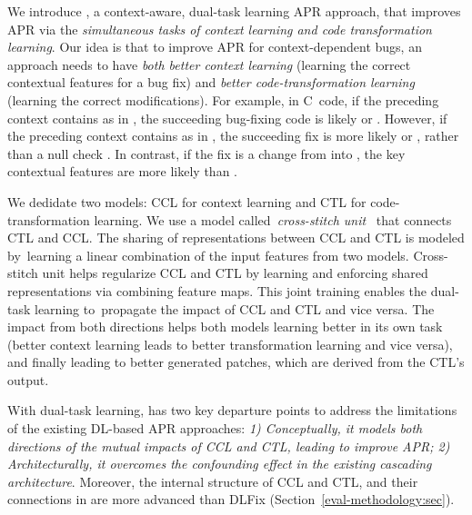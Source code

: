 We introduce {\tool}, a context-aware, dual-task learning APR
approach, that improves APR via the {\em simultaneous tasks of context
  learning and code transformation learning}. Our idea is that to
improve APR for context-dependent bugs, an approach needs to have {\em
  both better context learning} (learning the correct contextual
features for a bug fix) and {\em better code-transformation learning}
(learning the correct modifications). For example, in C~code, if the
preceding context contains  as in , the succeeding bug-fixing code is likely 
 \code{!=}  or  \code{==}
. However, if the preceding context contains 
as in  \code{=} , the
succeeding fix is more likely  \code{!=}
 or  \code{==} , rather than a
null check  \code{!=} . In contrast, if the
fix is a change from  \code{==}  into
 \code{!=} , the key contextual features are
more likely  than .

We dedidate two models: CCL for context learning and CTL for
code-transformation learning. We use a model called~{\em cross-stitch
  unit}~\cite{misra2016cross} that connects CTL and CCL. The sharing
of representations between CCL and CTL is modeled by~learning a linear
combination of the input features from two models. Cross-stitch unit
helps regularize CCL and CTL by learning and enforcing shared
representations via combining feature maps. This joint training enables
the dual-task learning to~pro\-pagate the impact of CCL and CTL and vice
versa. The impact from both directions helps both models learning
better in its own task (better context learning leads to better
transformation learning and vice versa), and finally leading to
better generated patches, which are derived from the CTL's output.


%
With dual-task learning, {\tool} has two key departure points to
address the limitations of the existing DL-based APR approaches: {\em
  1) Conceptually, it models both directions of the mutual impacts of
  CCL and CTL, leading to improve APR; 2) Architecturally, it
  overcomes the confounding effect in the existing cascading
  architecture}. Moreover, the internal structure of CCL and CTL, and
their connections in {\tool} are more advanced than DLFix
(Section~\ref{eval-methodology:sec}).

